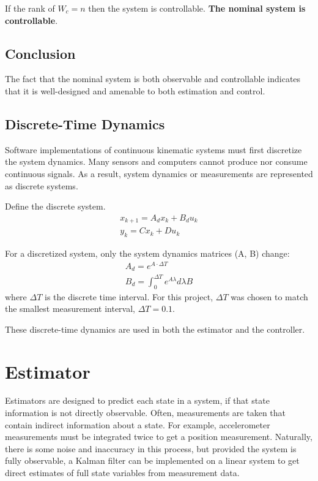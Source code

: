 \documentclass[12pt,onecolumn,reqno]{amsart}
\begin{document}
If the rank of $W_{c} = n$ then the system is controllable. \textbf{The nominal
system is controllable}.

\subsection{Conclusion}
The fact that the nominal system is both observable and controllable indicates
that it is well-designed and amenable to both estimation and control.

\subsection{Discrete-Time Dynamics} \label{sec:discrete_time}
Software implementations of continuous kinematic systems must first discretize
the system dynamics. Many sensors and computers cannot produce nor consume
continuous signals. As a result, system dynamics or measurements are
represented as discrete systems. 

Define the discrete system. 
\begin{align*}
  x_{k+1} = A_{d} x_{k} + B_{d} u_k \\
  y_{k} = C x_{k} + D u_{k}
\end{align*}

For a discretized system, only the system dynamics matrices (A, B) change:
\begin{align*}
  A_{d} = e^{A \cdot \Delta T} \\
  B_d = \int_{0}^{\Delta T} e^{A \lambda} d \lambda B
\end{align*}
where $\Delta T$ is the discrete time interval. For this project, $\Delta T$ was
chosen to match the smallest measurement interval, $\Delta T = 0.1$.

These discrete-time dynamics are used in both the estimator and the controller.


\section{Estimator} \label{sec:Kalman_filter}
Estimators are designed to predict each state in a system, if that state
information is not directly observable. Often, measurements are taken that
contain indirect information about a state. For example, accelerometer
measurements must be integrated twice to get a position measurement. Naturally,
there is some noise and inaccuracy in this process, but provided the system is
fully observable, a Kalman filter can be implemented on a linear system to get
direct estimates of full state variables from measurement data. 
\end{document}
